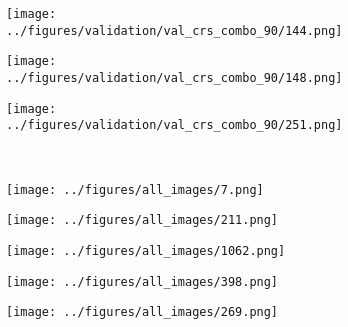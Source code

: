 \begin{figure}[h!]
\begin{subfigure}{0.18\textwidth}
		\centering
		\texttt{[image: ../figures/validation/val\_crs\_combo\_90/144.png]}
		\label{fig:1}
	\end{subfigure}
	\begin{subfigure}{0.18\textwidth}
		\centering
		\texttt{[image: ../figures/validation/val\_crs\_combo\_90/148.png]}
		\label{fig:1}
	\end{subfigure}
	\begin{subfigure}{0.18\textwidth}
		\centering
		\texttt{[image: ../figures/validation/val\_crs\_combo\_90/251.png]}
		\label{fig:1}
	\end{subfigure}
	\vspace{-0.35cm}
	\\
	\begin{subfigure}[b]{0.03\textwidth} %
		\centering
	\end{subfigure}
	\hspace{0.2cm}
		\begin{subfigure}{0.18\textwidth}
		\centering
		\texttt{[image: ../figures/all\_images/7.png]}
		\label{fig:1}
	\end{subfigure}
	\begin{subfigure}{0.18\textwidth}
		\centering
		\texttt{[image: ../figures/all\_images/211.png]}
		\label{fig:1}
	\end{subfigure}
	\begin{subfigure}{0.18\textwidth}
		\centering
		\texttt{[image: ../figures/all\_images/1062.png]}
		\label{fig:1}
	\end{subfigure}
	\begin{subfigure}{0.18\textwidth}
		\centering
		\texttt{[image: ../figures/all\_images/398.png]}
		\label{fig:1}
	\end{subfigure}
	\begin{subfigure}{0.18\textwidth}
		\centering
		\texttt{[image: ../figures/all\_images/269.png]}
		\label{fig:1}
	\end{subfigure}
	\vspace{-0.35cm}
	\\
	\begin{subfigure}[b]{0.03\textwidth} %
		\centering

\end{subfigure}
\end{figure}
